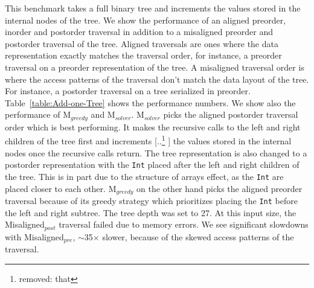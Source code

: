\documentclass[acmsmall,review,anonymous]{acmart}\settopmatter{printfolios=true,printccs=false,printacmref=false}
\newcommand{\systemSolver}{{\sc M$_{\mathit{solver}}$}\xspace} %
\newcommand{\systemGreedy}{{\sc M$_{\mathit{greedy}}$}\xspace} %
\newcommand{\misalignedPost}{{\sc Misaligned$_{\mathit{post}}$}\xspace} %
\newcommand{\misalignedPre}{{\sc Misaligned$_{\mathit{pre}}$}\xspace} %
\providecommand{\DIFaddtex}[1]{{\protect\color{blue} \sf #1}} %
\providecommand{\DIFdeltex}[1]{{\protect\color{red} [..\footnote{removed: #1} ]}} %
\providecommand{\DIFaddbegin}{} %
\providecommand{\DIFaddend}{} %
\providecommand{\DIFdelbegin}{} %
\providecommand{\DIFdelend}{} %
\providecommand{\DIFadd}[1]{\texorpdfstring{\DIFaddtex{#1}}{#1}} %
\providecommand{\DIFdel}[1]{\texorpdfstring{\DIFdeltex{#1}}{}} %
\newcommand{\DIFscaledelfig}{0.5}
\newlength{\DIFdelgraphicswidth} %
\newlength{\DIFdelgraphicsheight} %
\newcommand{\DIFaddincludegraphics}[2][]{{\color{blue}\fbox{\DIFOincludegraphics[#1]{#2}}}} %
\newcommand{\DIFdelincludegraphics}[2][]{%
\sbox{\DIFdelgraphicsbox}{\DIFOincludegraphics[#1]{#2}}%
\settoboxwidth{\DIFdelgraphicswidth}{\DIFdelgraphicsbox} %
\settoboxtotalheight{\DIFdelgraphicsheight}{\DIFdelgraphicsbox} %
\scalebox{\DIFscaledelfig}{%
\parbox[b]{\DIFdelgraphicswidth}{\usebox{\DIFdelgraphicsbox}\\[-\baselineskip] \rule{\DIFdelgraphicswidth}{0em}}\llap{\resizebox{\DIFdelgraphicswidth}{\DIFdelgraphicsheight}{%
\setlength{\unitlength}{\DIFdelgraphicswidth}%
\begin{picture}(1,1)%
\thicklines\linethickness{2pt} %
{\color[rgb]{1,0,0}\put(0,0){\framebox(1,1){}}}%
{\color[rgb]{1,0,0}\put(0,0){\line( 1,1){1}}}%
{\color[rgb]{1,0,0}\put(0,1){\line(1,-1){1}}}%
\end{picture}%
}\hspace*{3pt}}} %
} %
\DeclareRobustCommand{\DIFaddbegin}{\DIFOaddbegin \let\includegraphics\DIFaddincludegraphics} %
\DeclareRobustCommand{\DIFaddend}{\DIFOaddend \let\includegraphics\DIFOincludegraphics} %
\DeclareRobustCommand{\DIFdelbegin}{\DIFOdelbegin \let\includegraphics\DIFdelincludegraphics} %
\DeclareRobustCommand{\DIFdelend}{\DIFOaddend \let\includegraphics\DIFOincludegraphics} %
\begin{document}
This benchmark takes a full binary tree and increments the values stored in the internal nodes of the tree. 
We show the performance of an aligned preorder, inorder and postorder traversal in addition to a misaligned 
preorder and postorder traversal of the tree. Aligned traversals are ones where the data representation exactly
matches the traversal order, for instance, a preorder traversal on a preorder representation of the tree. 
A misaligned traversal order is where the access patterns of the traversal don't match the data layout of the tree.
For instance, a postorder traversal on a tree serialized in preorder. 
Table~\ref{table:Add-one-Tree} shows the performance numbers. We show also the performance of \systemGreedy and \systemSolver.
\systemSolver picks the aligned postorder traversal order which is best performing. It makes the recursive calls to the left and right children of the
tree first and increments \DIFdelbegin \DIFdel{that }\DIFdelend \DIFaddbegin \DIFadd{the }\DIFaddend values stored in the internal nodes once the recursive calls return. The tree representation is also changed to a postorder
representation with the \lstinline|Int| placed after the left and right children of the tree. 
\DIFaddbegin \DIFadd{This is in part due to the structure of arrays effect, as the }{\color{blue}%
\lstinline|Int| %
}%
\DIFadd{are placed closer to each other.
}\systemGreedy \DIFadd{on the other hand picks the 
aligned preorder traversal because of its greedy strategy which prioritizes placing the }{\color{blue}%
\lstinline|Int| %
}%
\DIFadd{before the left and right subtree.
}\DIFaddend The tree depth was set to 27. At this input size, the \misalignedPost traversal failed due to memory errors.
We see significant slowdowns with \misalignedPre, $\sim$35$\times$ slower, because of the skewed access patterns of the traversal.
\end{document}
